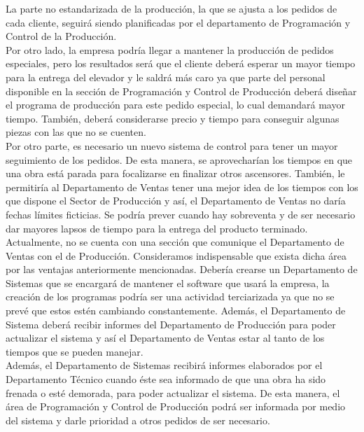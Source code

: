 \documentclass[a4paper,10pt,titlepage]{article}
\begin{document}
		\indent La parte no estandarizada de la producci\'on, la que se ajusta a los pedidos de cada cliente, seguir\'a siendo planificadas por el departamento de Programaci\'on y Control de la Producci\'on.\\
		\indent Por otro lado, la empresa podr\'ia llegar a mantener la producci\'on de pedidos especiales, pero los resultados ser\'a que el cliente deber\'a esperar un mayor tiempo para la entrega del elevador y le saldr\'a m\'as caro ya que parte del personal disponible en la secci\'on de Programaci\'on y Control de Producci\'on deber\'a diseñar el programa de producci\'on para este pedido especial, lo cual demandar\'a mayor tiempo. Tambi\'en, deber\'a considerarse precio y tiempo para conseguir algunas piezas con las que no se cuenten.\\
		\indent Por otro parte, es necesario un nuevo sistema de control para tener un mayor seguimiento de los pedidos. De esta manera, se aprovechar\'ian los tiempos en que una obra est\'a parada para focalizarse en finalizar otros ascensores. Tambi\'en, le permitir\'ia al Departamento de Ventas tener una mejor idea de los tiempos con los que dispone el Sector de Producci\'on y as\'i, el Departamento de Ventas no dar\'ia fechas l\'imites ficticias. Se podr\'ia prever cuando hay sobreventa y de ser necesario dar mayores lapsos de tiempo para la entrega del producto terminado.\\
		\indent Actualmente, no se cuenta con una secci\'on que comunique el Departamento de Ventas con el de Producci\'on. Consideramos indispensable que exista dicha \'area por las ventajas anteriormente mencionadas. Deber\'ia crearse un Departamento de Sistemas que se encargar\'a de mantener el software que usar\'a la empresa, la creaci\'on de los programas podr\'ia ser una actividad terciarizada ya que no se prev\'e que estos est\'en cambiando constantemente. Adem\'as, el Departamento de Sistema deber\'a recibir informes del Departamento de Producci\'on para poder actualizar el sistema y as\'i el Departamento de Ventas estar al tanto de los tiempos que se pueden manejar. \\
		\indent Adem\'as, el Departamento de Sistemas recibir\'a informes elaborados por el Departamento T\'ecnico cuando \'este sea informado de que una obra ha sido frenada o est\'e demorada, para poder actualizar el sistema. De esta manera, el \'area de Programaci\'on y Control de Producci\'on podr\'a ser informada por medio del sistema y darle prioridad a otros pedidos de ser necesario.\\
\end{document}
